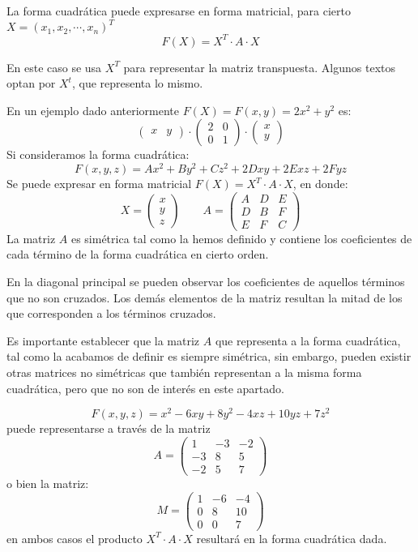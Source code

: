 La forma cuadrática puede expresarse en forma matricial, para cierto \(X=(x_1,x_2,\cdots,x_n)^T\)
\[
  F(X) = X^T \cdot A \cdot X
\]
\begin{tcolorbox}[remember, title=Aclaración tipográfica]
  En este caso se usa \(X^T\) para representar la matriz transpuesta. Algunos textos optan por \(X^t\), que representa lo mismo.
\end{tcolorbox}
En un ejemplo dado anteriormente \(F(X) = F(x,y) = 2x^2 + y^2\) es:
\[
  \begin{pmatrix}
    x & y
  \end{pmatrix} \cdot \begin{pmatrix}
    2 & 0 \\
    0 & 1
  \end{pmatrix} \cdot \begin{pmatrix}
    x \\ y
  \end{pmatrix}
\]
Si consideramos la forma cuadrática:
\[
  F(x,y,z) = Ax^2 + By^2 + Cz^2 + 2Dxy + 2Exz + 2Fyz
\]
Se puede expresar en forma matricial \(F(X) = X^T \cdot A \cdot X \), en donde:
\[
X = \begin{pmatrix}
  x \\ y \\z
\end{pmatrix} \qquad A = \begin{pmatrix}
  A & D & E\\
  D & B & F\\
  E & F & C
\end{pmatrix}
\]
La matriz \(A\) es simétrica tal como la hemos definido y contiene los coeficientes de cada término de la forma cuadrática en cierto orden.

En la diagonal principal se pueden observar los coeficientes de aquellos términos que no son cruzados. Los demás elementos de la matriz resultan la mitad de los que corresponden a los términos cruzados.

Es importante establecer que la matriz \(A\) que representa a la forma cuadrática, tal como la acabamos de definir es siempre simétrica, sin embargo, pueden existir otras matrices no simétricas que también representan a la misma forma cuadrática, pero que no son de interés en este apartado.

\[
F(x,y,z) = x^2 - 6 x y + 8 y^2 - 4 x z + 10 y z + 7 z^2
\]
puede representarse a través de la matriz 
\[
A = \begin{pmatrix}
  1 & -3 & -2 \\
  -3 & 8 & 5 \\
  -2 & 5 & 7
\end{pmatrix}
\]
o bien la matriz:
\[
M = \begin{pmatrix}
  1 & -6 & -4 \\
  0 & 8 & 10 \\
  0 & 0 & 7
\end{pmatrix}
\]
en ambos casos el  producto \(X^T \cdot A \cdot X\) resultará en la forma cuadrática dada.

